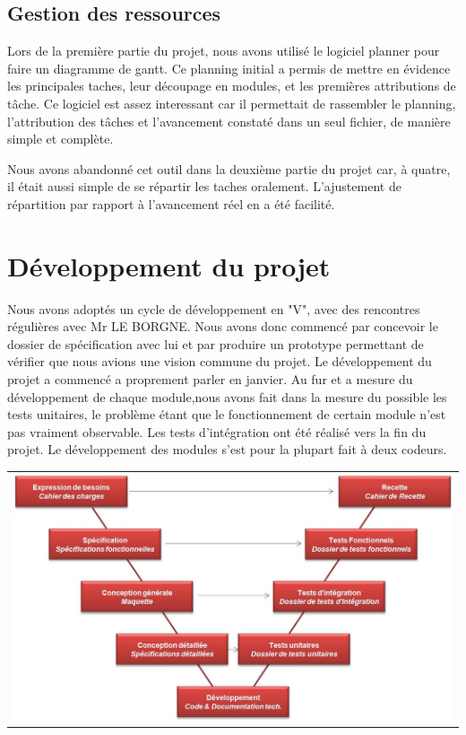 \subsection{Gestion des ressources}

Lors de la première partie du projet, nous avons utilisé le logiciel planner pour faire un diagramme de gantt. Ce planning initial a permis de mettre en évidence les principales taches, leur découpage en modules, et les premières attributions de tâche. Ce logiciel est assez interessant car il permettait de rassembler le planning, l'attribution des tâches et l'avancement constaté dans un seul fichier, de manière simple et complète. 

Nous avons abandonné cet outil dans la deuxième partie du projet car, à quatre, il était aussi simple de se répartir les taches oralement. L'ajustement de répartition par rapport à l'avancement réel en a été facilité.

\section{Développement du projet}

Nous avons adoptés un cycle de développement en "V", avec des rencontres régulières avec Mr LE BORGNE. Nous avons donc commencé par concevoir le dossier de spécification avec lui et par produire un prototype permettant de vérifier que nous avions une vision commune du projet. Le développement du projet a commencé a proprement parler en janvier. Au fur et a mesure du développement de chaque module,nous avons fait dans la mesure du possible les tests unitaires, le problème étant que le fonctionnement de certain module n'est pas vraiment observable. Les tests d'intégration ont été réalisé vers la fin du projet. Le développement des modules s'est pour la plupart fait à deux codeurs.

\begin{tabular}{c}
\includegraphics[width=140mm]{Images/Cycle_en_V.jpg}
\end{tabular}

